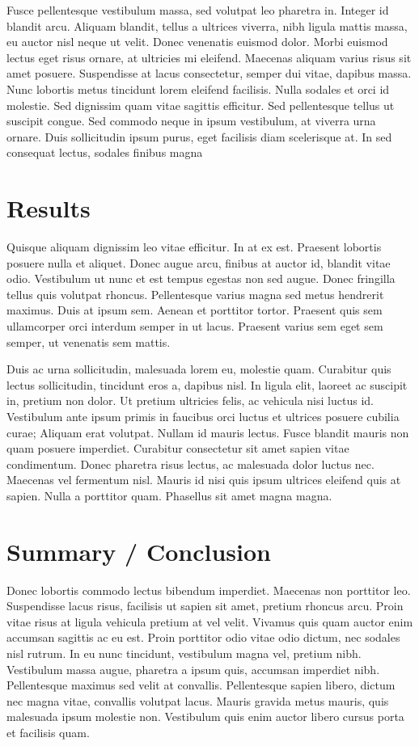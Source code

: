 \documentclass[linenumbers,RNAAS,trackchanges]{aastex631}
\begin{document}
Fusce pellentesque vestibulum massa, sed volutpat leo pharetra in. Integer id blandit arcu. Aliquam blandit, tellus a ultrices viverra, nibh ligula mattis massa, eu auctor nisl neque ut velit. Donec venenatis euismod dolor. Morbi euismod lectus eget risus ornare, at ultricies mi eleifend. Maecenas aliquam varius risus sit amet posuere. Suspendisse at lacus consectetur, semper dui vitae, dapibus massa. Nunc lobortis metus tincidunt lorem eleifend facilisis. Nulla sodales et orci id molestie. Sed dignissim quam vitae sagittis efficitur. Sed pellentesque tellus ut suscipit congue. Sed commodo neque in ipsum vestibulum, at viverra urna ornare. Duis sollicitudin ipsum purus, eget facilisis diam scelerisque at. In sed consequat lectus, sodales finibus magna


\section{Results} \label{sec:results}
Quisque aliquam dignissim leo vitae efficitur. In at ex est. Praesent lobortis posuere nulla et aliquet. Donec augue arcu, finibus at auctor id, blandit vitae odio. Vestibulum ut nunc et est tempus egestas non sed augue. Donec fringilla tellus quis volutpat rhoncus. Pellentesque varius magna sed metus hendrerit maximus. Duis at ipsum sem. Aenean et porttitor tortor. Praesent quis sem ullamcorper orci interdum semper in ut lacus. Praesent varius sem eget sem semper, ut venenatis sem mattis.

Duis ac urna sollicitudin, malesuada lorem eu, molestie quam. Curabitur quis lectus sollicitudin, tincidunt eros a, dapibus nisl. In ligula elit, laoreet ac suscipit in, pretium non dolor. Ut pretium ultricies felis, ac vehicula nisi luctus id. Vestibulum ante ipsum primis in faucibus orci luctus et ultrices posuere cubilia curae; Aliquam erat volutpat. Nullam id mauris lectus. Fusce blandit mauris non quam posuere imperdiet. Curabitur consectetur sit amet sapien vitae condimentum. Donec pharetra risus lectus, ac malesuada dolor luctus nec. Maecenas vel fermentum nisl. Mauris id nisi quis ipsum ultrices eleifend quis at sapien. Nulla a porttitor quam. Phasellus sit amet magna magna.

\section{Summary /  Conclusion} \label{sec:summary}
Donec lobortis commodo lectus bibendum imperdiet. Maecenas non porttitor leo. Suspendisse lacus risus, facilisis ut sapien sit amet, pretium rhoncus arcu. Proin vitae risus at ligula vehicula pretium at vel velit. Vivamus quis quam auctor enim accumsan sagittis ac eu est. Proin porttitor odio vitae odio dictum, nec sodales nisl rutrum. In eu nunc tincidunt, vestibulum magna vel, pretium nibh. Vestibulum massa augue, pharetra a ipsum quis, accumsan imperdiet nibh. Pellentesque maximus sed velit at convallis. Pellentesque sapien libero, dictum nec magna vitae, convallis volutpat lacus. Mauris gravida metus mauris, quis malesuada ipsum molestie non. Vestibulum quis enim auctor libero cursus porta et facilisis quam.
\end{document}
